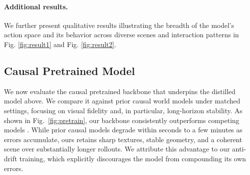 \paragraph{Additional results.}
We further present qualitative results illustrating the breadth of the model's action space and its behavior across diverse scenes and interaction patterns in Fig. \ref{fig:result1} and Fig. \ref{fig:result2}.

\subsection{Causal Pretrained Model}
\label{subsec:pretrain}

We now evaluate the causal pretrained backbone that underpins the distilled model above. We compare it against prior causal world models under matched settings, focusing on visual fidelity and, in particular, long-horizon stability. As shown in Fig.~\ref{fig:pretrain}, our backbone consistently outperforms competing models \cite{MAGI-1,Worldplay}. While prior causal models degrade within seconds to a few minutes as errors accumulate, ours retains sharp textures, stable geometry, and a coherent scene over substantially longer rollouts. We attribute
this advantage to our anti-drift training, which explicitly discourages the model from compounding its own errors.